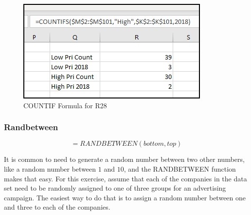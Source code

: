 \begin{enumerate}
	\begin{figure}[H]
		\centering
		\includegraphics[width=\maxwidth{.75\linewidth}]{gfx/ch09_fig43}
		\caption{COUNTIF Formula for R28}
		\label{09:fig43}
	\end{figure}
		
\end{enumerate}

\subsubsection{Randbetween}

\[ =RANDBETWEEN(bottom, top) \]

It is common to need to generate a random number between two other numbers, like a random number between $ 1 $ and $ 10 $, and the RANDBETWEEN function makes that easy. For this exercise, assume that each of the companies in the data set need to be randomly assigned to one of  three groups for an advertising campaign. The easiest way to do that is to assign a random number between one and three to each of the companies.

